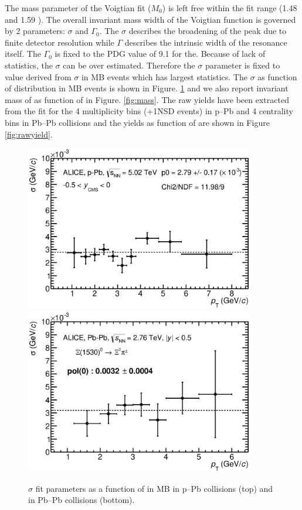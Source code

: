 The mass parameter of the Voigtian fit ($M_{0}$) is left free within the fit range (1.48 \Gmass and 1.59 \Gmass). The overall invariant mass width of the Voigtian function is governed by 2 parameters: $\sigma$ and $\Gamma_{0}$. The $\sigma$ describes the broadening of the peak due to finite detector resolution while $\Gamma$ describes the intrinsic width of the resonance itself. The $\Gamma_{0}$ is fixed to the PDG value of 9.1 \mmom for the\xis. Because of lack of statistics, the $\sigma$ can be over estimated. Therefore the $\sigma$ parameter is fixed to value derived from $\sigma$ in MB events which has largest statistics. The $\sigma$ as function of \pt distribution in MB events is shown in Figure. \ref{fig:sigma} and we also report invariant mass of \xis as function of \pt in Figure. \ref{fig:mass}. The \xis raw yields have been extracted from the fit for the 4 multiplicity bins (+1NSD events) in p--Pb and 4 centrality bins in Pb--Pb collisions and the yields as function of \pt are shown in Figure \ref{fig:rawyield}.



\begin{figure}[htbp]
\begin{center}
\includegraphics[width=10.0cm]{./Version1/FigChapter5/Extraction/pPbWidthMB.eps}
\hspace{0.5cm}
\includegraphics[width=10.0cm]{./Version1/FigChapter5/Extraction/PbPbWidthMB.eps}
\caption{$\sigma$ fit parameters as a function of \pt in MB in p--Pb collisions (top) and in Pb--Pb collisions (bottom).} 
 \label{fig:sigma}
\end{center}
\end{figure}



